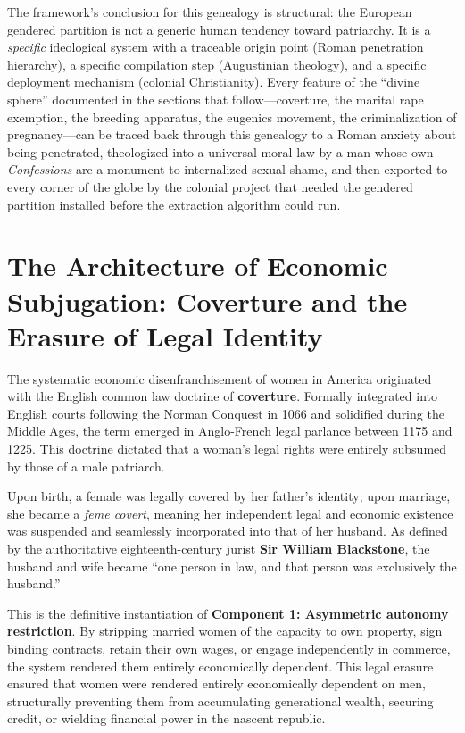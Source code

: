 \documentclass[12pt,openany]{book}
\begin{document}
The framework's conclusion for this genealogy is structural: the European gendered partition is not a generic human tendency toward patriarchy. It is a \textit{specific} ideological system with a traceable origin point (Roman penetration hierarchy), a specific compilation step (Augustinian theology), and a specific deployment mechanism (colonial Christianity). Every feature of the ``divine sphere'' documented in the sections that follow---coverture, the marital rape exemption, the breeding apparatus, the eugenics movement, the criminalization of pregnancy---can be traced back through this genealogy to a Roman anxiety about being penetrated, theologized into a universal moral law by a man whose own \textit{Confessions} are a monument to internalized sexual shame, and then exported to every corner of the globe by the colonial project that needed the gendered partition installed before the extraction algorithm could run.

\section{The Architecture of Economic Subjugation: Coverture and the Erasure of Legal Identity}

The systematic economic disenfranchisement of women in America originated with the English common law doctrine of \textbf{coverture}. Formally integrated into English courts following the Norman Conquest in 1066 and solidified during the Middle Ages, the term emerged in Anglo-French legal parlance between 1175 and 1225. This doctrine dictated that a woman’s legal rights were entirely subsumed by those of a male patriarch. 

Upon birth, a female was legally covered by her father’s identity; upon marriage, she became a \textit{feme covert}, meaning her independent legal and economic existence was suspended and seamlessly incorporated into that of her husband. As defined by the authoritative eighteenth-century jurist \textbf{Sir William Blackstone}, the husband and wife became ``one person in law, and that person was exclusively the husband.'' 

This is the definitive instantiation of \textbf{Component 1: Asymmetric autonomy restriction}. By stripping married women of the capacity to own property, sign binding contracts, retain their own wages, or engage independently in commerce, the system rendered them entirely economically dependent. This legal erasure ensured that women were rendered entirely economically dependent on men, structurally preventing them from accumulating generational wealth, securing credit, or wielding financial power in the nascent republic. 
\end{document}
